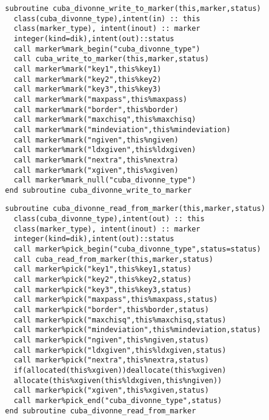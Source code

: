 \begin{Verbatim}
  subroutine cuba_divonne_write_to_marker(this,marker,status)
    class(cuba_divonne_type),intent(in) :: this
    class(marker_type), intent(inout) :: marker
    integer(kind=dik),intent(out)::status
    call marker%mark_begin("cuba_divonne_type")
    call cuba_write_to_marker(this,marker,status)
    call marker%mark("key1",this%key1)
    call marker%mark("key2",this%key2)
    call marker%mark("key3",this%key3)
    call marker%mark("maxpass",this%maxpass)
    call marker%mark("border",this%border)
    call marker%mark("maxchisq",this%maxchisq)
    call marker%mark("mindeviation",this%mindeviation)
    call marker%mark("ngiven",this%ngiven)
    call marker%mark("ldxgiven",this%ldxgiven)
    call marker%mark("nextra",this%nextra)
    call marker%mark("xgiven",this%xgiven)
    call marker%mark_null("cuba_divonne_type")
  end subroutine cuba_divonne_write_to_marker
\end{Verbatim}

\begin{Verbatim}
  subroutine cuba_divonne_read_from_marker(this,marker,status)
    class(cuba_divonne_type),intent(out) :: this
    class(marker_type), intent(inout) :: marker
    integer(kind=dik),intent(out)::status
    call marker%pick_begin("cuba_divonne_type",status=status)
    call cuba_read_from_marker(this,marker,status)
    call marker%pick("key1",this%key1,status)
    call marker%pick("key2",this%key2,status)
    call marker%pick("key3",this%key3,status)
    call marker%pick("maxpass",this%maxpass,status)
    call marker%pick("border",this%border,status)
    call marker%pick("maxchisq",this%maxchisq,status)
    call marker%pick("mindeviation",this%mindeviation,status)
    call marker%pick("ngiven",this%ngiven,status)
    call marker%pick("ldxgiven",this%ldxgiven,status)
    call marker%pick("nextra",this%nextra,status)
    if(allocated(this%xgiven))deallocate(this%xgiven)
    allocate(this%xgiven(this%ldxgiven,this%ngiven))
    call marker%pick("xgiven",this%xgiven,status)
    call marker%pick_end("cuba_divonne_type",status)
  end subroutine cuba_divonne_read_from_marker
\end{Verbatim}

